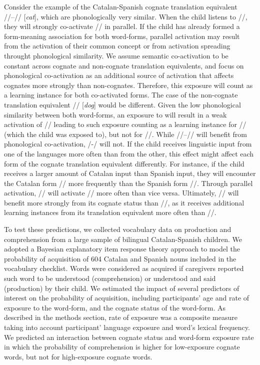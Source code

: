 \documentclass[
]{article}
\begin{document}
Consider the example of the Catalan-Spanish cognate translation
equivalent //--// {[}\emph{cat}{]}, which
are phonologically very similar. When the child listens to
//, they will strongly co-activate // in
parallel. If the child has already formed a form-meaning association for
both word-forms, parallel activation may result from the activation of
their common concept or from activation spreading throught phonological
similarity. We assume semantic co-activation to be constant across
cognate and non-cognate translation equivalents, and focus on
phonological co-activation as an additional source of activation that
affects cognates more strongly than non-cognates. Therefore, this
exposure will count as a learning instance for both co-activated forms.
The case of the non-cognate translation equivalent
// {[}\emph{dog}{]} would be different. Given the
low phonological similarity between both word-forms, an exposure to
 will result in a weak activation of //
leading to such exposure counting as a learning instance for
// (which the child was exposed to), but not for
//. While //--// will
benefit from phonological co-activation,
/-/ will not. If the child receives
linguistic input from one of the languages more often than from the
other, this effect might affect each form of the cognate translation
equivalent differently. For instance, if the child receives a larger
amount of Catalan input than Spanish input, they will encounter the
Catalan form // more frequently than the Spanish form
//. Through parallel activation, // will
activate // more often than vice versa. Ultimately,
// will benefit more strongly from its cognate status
than //, as it receives additional learning instances from
its translation equivalent more often than //.

To test these predictions, we collected vocabulary data on production
and comprehension from a large sample of bilingual Catalan-Spanish
children. We adopted a Bayesian explanatory item response theory
approach to model the probability of acquisition of 604 Catalan and
Spanish nouns included in the vocabulary checklist. Words were
considered as acquired if caregivers reported such word to be understood
(comprehension) or understood and said (production) by their child. We
estimated the impact of several predictors of interest on the
probability of acquisition, including participants' age and rate of
exposure to the word-form, and the cognate status of the word-form. As
described in the methods section, rate of exposure was a composite
measure taking into account participant' language exposure and word's
lexical frequency. We predicted an interaction between cognate status
and word-form exposure rate in which the probability of comprehension is
higher for low-exposure cognate words, but not for high-exposure cognate
words.
\end{document}
